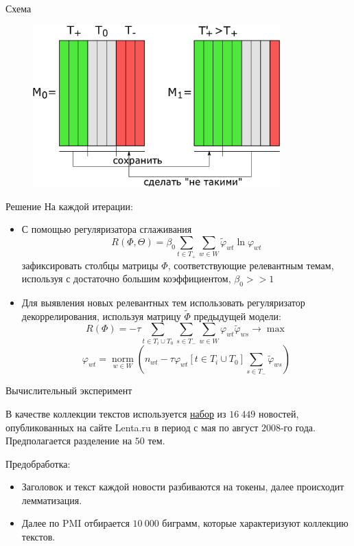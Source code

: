 \documentclass{beamer}
\DeclareMathOperator*{\norm}{\text{norm}}
\begin{document}
\begin{frame}{Схема}
    \begin{figure}
    \includegraphics[width=0.85\textwidth]{scheme}
    \end{figure}
\end{frame}

\begin{frame}{Решение}
На каждой итерации:
\begin{itemize}
    \item С помощью регуляризатора сглаживания
    $$R (\Phi, \Theta) = \beta_0 \sum \limits_{t \in T_+} \sum \limits_{w \in W} \widetilde{\varphi}_{wt} \ln \varphi_{wt} $$
    зафиксировать столбцы матрицы $\Phi$, соответствующие релевантным темам, используя с достаточно большим коэффициентом, $\beta_0 >> 1$
    \item Для выявления новых релевантных тем использовать регуляризатор декоррелирования, используя матрицу $\widetilde{\Phi}$ предыдущей модели:
        $$R(\Phi) = -\tau \sum \limits_{t \in T_i \cup T_0} \sum \limits_{s \in T_-} \sum \limits_{w \in W} \varphi_{wt} \widetilde{\varphi}_{ws} \to \max$$
        $$\varphi_{wt} = \norm \limits_{w \in W} \left(n_{wt} - \tau \varphi_{wt} [t \in T_i \cup T_0] \sum \limits_{s \in T_-} \widetilde{\varphi}_{ws}\right)$$
\end{itemize}
\end{frame}
\begin{frame}{Вычислительный эксперимент}

В качестве коллекции текстов используется \href{https://disk.yandex.ru/d/DAdhmVB2eFkdBQ}{набор} из $16 \ 449$ новостей, опубликованных на сайте Lenta.ru в период с мая по август $2008$-го года.
Предполагается разделение на $50$ тем.

\begin{block}{Предобработка:}
\begin{itemize}
    \item Заголовок и текст каждой новости разбиваются на токены, далее происходит лемматизация.
    \item Далее по PMI отбирается $10 \ 000$ биграмм, которые характеризуют коллекцию текстов.
\end{itemize}
\end{block}

\end{frame}
\end{document}
